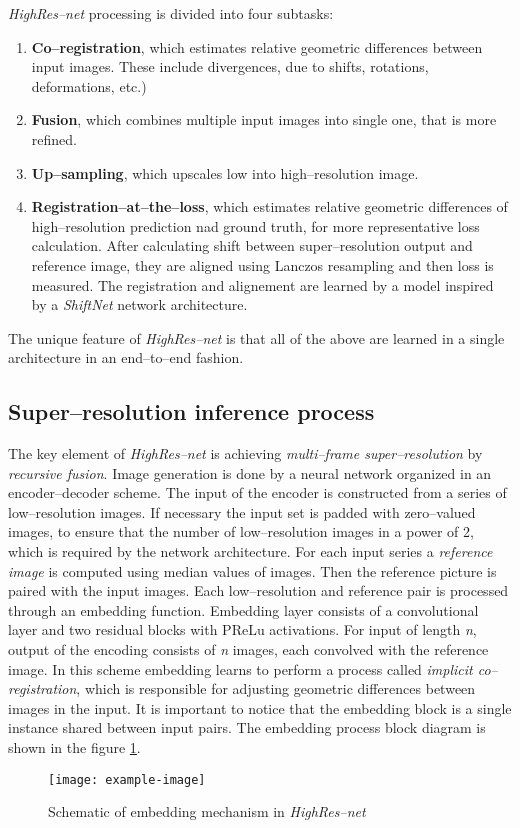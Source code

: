 \textit{HighRes--net} processing is divided into four subtasks:
\begin{enumerate}
	\item \textbf{Co--registration}, which estimates relative geometric differences between input images. These include divergences, due to shifts, rotations, deformations, etc.)
	\item \textbf{Fusion}, which combines multiple input images into single one, that is more refined.
	\item \textbf{Up--sampling}, which upscales low into high--resolution image.
	\item \textbf{Registration--at--the--loss}, which estimates relative geometric differences of high--resolution prediction nad ground truth, for more representative loss calculation. After calculating shift between super--resolution output and reference image, they are aligned using Lanczos resampling and then loss is measured.
	    The registration and alignement are learned by a model inspired by a \textit{ShiftNet} network architecture.
\end{enumerate}
The unique feature of \textit{HighRes--net} is that all of the above are learned in a single architecture in an end--to--end fashion.

\subsection{Super--resolution inference process}
The key element of \textit{HighRes--net} is achieving \textit{multi--frame super--resolution} by \textit{recursive fusion}.
Image generation is done by a neural network organized in an encoder--decoder scheme.
The input of the encoder is constructed from a series of low--resolution images.
If necessary the input set is padded with zero--valued images, to ensure that the number of low--resolution images in a power of 2, which is required by the network architecture.
For each input series a \textit{reference image} is computed using median values of images.
Then the reference picture is paired with the input images.
Each low--resolution and reference pair is processed through an embedding function.
Embedding layer consists of a convolutional layer and two residual blocks with PReLu activations.
For input of length \textit{n}, output of the encoding consists of \textit{n} images, each convolved with the reference image.
In this scheme embedding learns to perform a process called \textit{implicit co--registration}, which is responsible for adjusting geometric differences between images in the input.
It is important to notice that the embedding block is a single instance shared between input pairs.
The embedding process block diagram is shown in the figure \ref{fig:highresnet-embedding}.
\begin{figure}
    \centering
    \texttt{[image: example-image]}
    \caption{Schematic of embedding mechanism in \textit{HighRes--net}}
    \label{fig:highresnet-embedding}
\end{figure}

